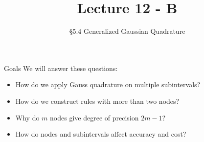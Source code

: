 \documentclass[10pt]{beamer}
\title[Math/CS 375]{Lecture 12 - B}
\subtitle{ \S 5.4 Generalized Gaussian Quadrature}
\begin{document}
\begin{frame}
  \titlepage
\end{frame}

\begin{frame}{Goals}
We will answer these questions:\\[3mm]
\begin{itemize}
    \item How do we apply Gauss quadrature on multiple subintervals?
    \item How do we construct rules with more than two nodes?
    \item Why do $m$ nodes give degree of precision $2m-1$?
    \item How do nodes and subintervals affect accuracy and cost?
\end{itemize}
\end{frame}
\end{document}
